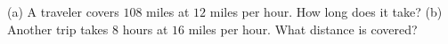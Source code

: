 (a) A traveler covers $108$ miles at $12$ miles per hour. How long does it take? (b) Another trip takes $8$ hours at $16$ miles per hour. What distance is covered?
